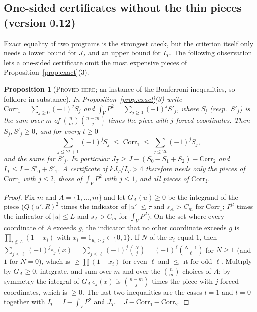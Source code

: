 \documentclass[11pt]{amsart}
\newtheorem{proposition}[theorem]{Proposition}
\theoremstyle{definition}
\theoremstyle{remark}
\newcommand{\lbl}[1]{\textup{\textsc{#1}}}
\begin{document}
\subsection*{One-sided certificates without the thin pieces (version 0.12)}
Exact equality of two programs is the strongest check, but the criterion
itself only needs a lower bound for $J_T$ and an upper bound for $I_T$. The
following observation lets a one-sided certificate omit the most expensive
pieces of Proposition~\ref{prop:exact}(3).

\begin{proposition}[\lbl{Proved here}; an instance of the Bonferroni inequalities, so folklore in substance]\label{prop:bonf}
In Proposition~\ref{prop:exact}(3) write $\mathrm{Corr}_1=\sum_{j\ge0}(-1)^jS_j$
and $\int_VP^2=\sum_{j\ge0}(-1)^jS'_j$, where $S_j$ (resp.\ $S'_j$) is the sum
over $m$ of $\binom nm\binom{n-m}{j}$ times the piece with $j$ forced
coordinates. Then $S_j,S'_j\ge0$, and for every $t\ge0$
\[
\sum_{j\le 2t+1}(-1)^jS_j\;\le\;\mathrm{Corr}_1\;\le\;\sum_{j\le2t}(-1)^jS_j,
\]
and the same for $S'_j$. In particular
$J_T\ge J-\left(S_0-S_1+S_2\right)-\mathrm{Corr}_2$ and
$I_T\le I-S'_0+S'_1$. A certificate of $kJ_T/I_T>4$ therefore needs only
the pieces of $\mathrm{Corr}_1$ with $j\le2$, those of $\int_VP^2$ with
$j\le1$, and all pieces of $\mathrm{Corr}_2$.
\end{proposition}

\begin{proof}
Fix $m$ and $A=\{1,\dots,m\}$ and let $G_A(u)\ge0$ be the integrand of the
piece ($Q(u',R)^2$ times the indicator of $|u'|\le\tau$ and $s_A>C_m$ for
$\mathrm{Corr}_1$; $P^2$ times the indicator of $|u|\le L$ and $s_A>C_m$ for
$\int_VP^2$). On the set where every coordinate of $A$ exceeds $g$, the
indicator that no other coordinate exceeds $g$ is $\prod_{i\notin A}(1-x_i)$
with $x_i=1_{u_i>g}\in\{0,1\}$. If $N$ of the $x_i$ equal $1$, then
$\sum_{j\le\ell}(-1)^je_j(x)=\sum_{j\le\ell}(-1)^j\binom Nj=(-1)^\ell\binom{N-1}{\ell}$
for $N\ge1$ (and $1$ for $N=0$), which is $\ge\prod(1-x_i)$ for even $\ell$ and
$\le$ it for odd $\ell$. Multiply by $G_A\ge0$, integrate, and sum over $m$
and over the $\binom nm$ choices of $A$; by symmetry the integral of
$G_A\,e_j(x)$ is $\binom{n-m}{j}$ times the piece with $j$ forced
coordinates, which is $\ge0$. The last two inequalities are the cases $t=1$
and $t=0$ together with $I_T=I-\int_VP^2$ and
$J_T=J-\mathrm{Corr}_1-\mathrm{Corr}_2$.
\end{proof}
\end{document}
